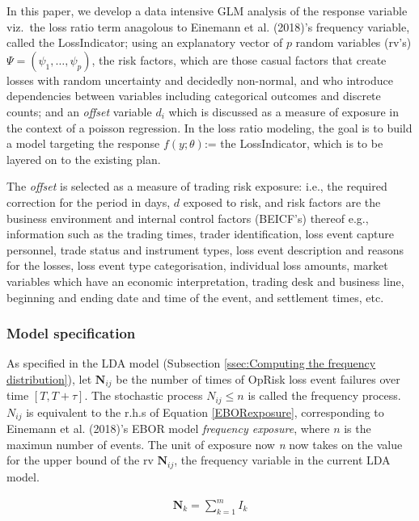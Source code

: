 \documentclass{DissertateUSU}
\begin{document}
In this paper, we develop a data intensive GLM analysis of the response
variable viz.~the loss ratio term anagolous to Einemann et al. (2018)'s
frequency variable, called the LossIndicator; using an explanatory
vector of \(p\) random variables (rv's)
\(\Psi = (\psi_1,\ldots,\psi_p)\), the risk factors, which are those
casual factors that create losses with random uncertainty and decidedly
non-normal, and who introduce dependencies between variables including
categorical outcomes and discrete counts; and an \emph{offset} variable
\(d_i\) which is discussed as a measure of exposure in the context of a
poisson regression. In the loss ratio modeling, the goal is to build a
model targeting the response \(f(y;\theta)\):= the LossIndicator, which
is to be layered on to the existing plan.\medskip

The \emph{offset} is selected as a measure of trading risk exposure:
i.e., the required correction for the period in days, \(d\) exposed to
risk, and risk factors are the business environment and internal control
factors (BEICF's) thereof e.g., information such as the trading times,
trader identification, loss event capture personnel, trade status and
instrument types, loss event description and reasons for the losses,
loss event type categorisation, individual loss amounts, market
variables which have an economic interpretation, trading desk and
business line, beginning and ending date and time of the event, and
settlement times, etc.

\subsubsection{Model specification}
\label{sssec:Model specification}

As specified in the LDA model (Subsection
\ref{ssec:Computing the frequency distribution}), let
\(\mathbf{N}_{ij}\) be the number of times of OpRisk loss event failures
over time \([T,T+\tau]\). The stochastic process \(N_{ij}\leq n\) is
called the frequency process. \(N_{ij}\) is equivalent to the r.h.s of
Equation \ref{EBORexposure}, corresponding to Einemann et al. (2018)'s
EBOR model \emph{frequency exposure}, where \(n\) is the maximun number
of events. The unit of exposure now \emph{n} now takes on the value for
the upper bound of the rv \(\mathbf{N}_{ij}\), the frequency variable in
the current LDA model.

\singlespacing

\begin{eqnarray}
\mathbf{N}_k = \sum_{k=1}^m I_k 
\end{eqnarray} \doublespacing
\end{document}
